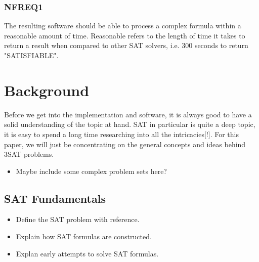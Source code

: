 \documentclass{article}
\begin{document}
\subsubsection{NFREQ1}
The resulting software should be able to process a complex formula within a reasonable amount of time. Reasonable refers to the length of time it takes to return a result when compared to other SAT solvers, i.e. 300 seconds to return "SATISFIABLE".


\section{Background}
Before we get into the implementation and software, it is always good to have a solid understanding
of the topic at hand. SAT in particular is quite a deep topic, it is easy to spend a long time
researching into all the intricacies[!]. For this paper, we will just be concentrating on the
general concepts and ideas behind 3SAT problems.

\begin{itemize}
    \item Maybe include some complex problem sets here?
\end{itemize}


\subsection{SAT Fundamentals}
\begin{itemize}
    \item Define the SAT problem with reference.
    \item Explain how SAT formulas are constructed.
    \item Explan early attempts to solve SAT formulas.
\end{itemize}
\end{document}
